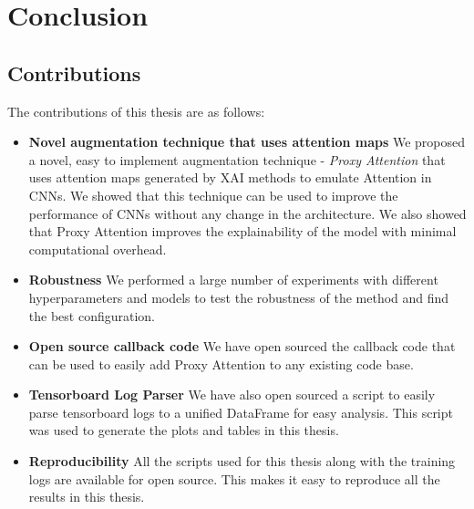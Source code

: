 \chapter{Conclusion}
\section{Contributions}
The contributions of this thesis are as follows:
\begin{itemize}
    \item \textbf{Novel augmentation technique that uses attention maps} We proposed a novel, easy to implement augmentation technique - \textit{Proxy Attention} that uses attention maps generated by XAI methods to emulate Attention in CNNs. We showed that this technique can be used to improve the performance of CNNs without any change in the architecture. We also showed that Proxy Attention improves the explainability of the model with minimal computational overhead.
    \item \textbf{Robustness} We performed a large number of experiments with different hyperparameters and models to test the robustness of the method and find the best configuration. 
    \item \textbf{Open source callback code} We have open sourced the callback code that can be used to easily add Proxy Attention to any existing code base.
    \item \textbf{Tensorboard Log Parser} We have also open sourced a script to easily parse tensorboard logs to a unified DataFrame for easy analysis. This script was used to generate the plots and tables in this thesis.
    \item \textbf{Reproducibility} All the scripts used for this thesis along with the training logs are available for open source. This makes it easy to reproduce all the results in this thesis.
\end{itemize}

